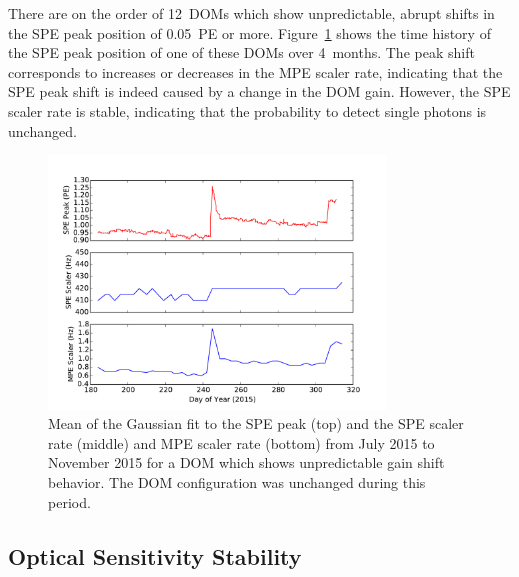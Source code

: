There are on the
order of 12~DOMs which show unpredictable, abrupt shifts in the SPE peak
position of 0.05~PE or more. Figure~\ref{fig:gainshift_spe} shows the time history of the
SPE peak position of one of these DOMs over 4~months. The peak shift
corresponds to increases or decreases in the MPE scaler rate,
indicating that the SPE peak shift is indeed caused by a change in the DOM
gain. However, the SPE scaler rate is stable, indicating that the
probability to detect single photons is unchanged.

\begin{figure}[!h]
 \centering
 \includegraphics[width=0.8\textwidth]{graphics/dom/reliability/gainshift.pdf}
 \caption{Mean of the Gaussian fit to the SPE peak (top) and the SPE
   scaler rate (middle) and MPE
   scaler rate (bottom) from July 2015 to November 2015 for a DOM
   which shows unpredictable gain shift behavior. The DOM
   configuration was unchanged during this period.}
 \label{fig:gainshift_spe}
\end{figure}

\subsection{Optical Sensitivity Stability}

